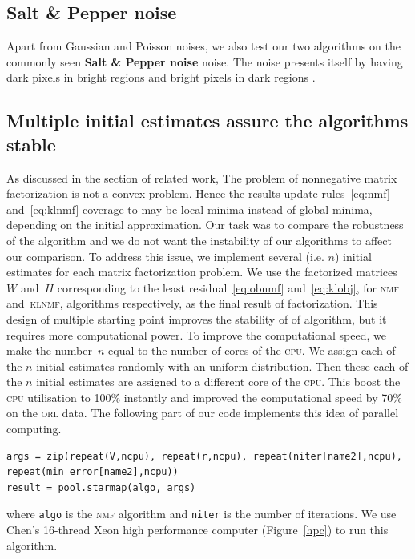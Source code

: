 \subsection{Salt \& Pepper noise}
Apart from Gaussian and Poisson noises, we also test our two algorithms on the commonly seen \textbf{Salt \& Pepper noise} noise. The noise presents itself by having dark pixels in bright regions and bright pixels in dark regions \citep{sampat2005computer}.

\subsection{Multiple initial estimates assure the algorithms stable}
As discussed in the section of related work,
The problem of nonnegative matrix factorization is not a convex problem.
Hence the results update rules~\eqref{eq:nmf} and~\eqref{eq:klnmf} coverage to may be local minima instead of global minima, depending on the initial approximation.
Our task was to compare the robustness of the algorithm and we do not want the instability of our algorithms to affect our comparison.
To address this issue, we implement several (i.e. $n$) initial estimates for each matrix factorization problem.
We use the factorized matrices~$W$ and~$H$ corresponding to the least residual~\eqref{eq:obnmf} and~\eqref{eq:klobj}, for \textsc{nmf} and~\textsc{klnmf}, algorithms respectively, as the final result of factorization.
This design of multiple starting point improves the stability of of algorithm, but it requires more computational power. To improve the computational speed, we make the number~$n$ equal to the number of cores of the \textsc{cpu}. We assign each of the $n$ initial estimates randomly with an uniform distribution. Then these each of the $n$ initial estimates are assigned to a different core of the \textsc{cpu}. This boost the \textsc{cpu} utilisation to 100\% instantly and improved the computational speed by 70\% on the \textsc{orl} data. The following part of our code implements this idea of parallel computing.
\begin{lstlisting}[caption=Centring image data, label=matn1]
args = zip(repeat(V,ncpu), repeat(r,ncpu), repeat(niter[name2],ncpu), repeat(min_error[name2],ncpu))
result = pool.starmap(algo, args)
\end{lstlisting}
where \texttt{algo} is the \textsc{nmf} algorithm and \texttt{niter} is the number of iterations. We use Chen's 16-thread Xeon high performance computer (Figure~\ref{hpc}) to run this algorithm.

